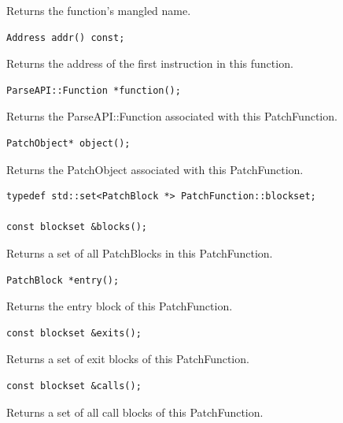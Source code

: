 \documentclass[11pt]{article}
\begin{document}
Returns the function's mangled name.


\begin{verbatim}
Address addr() const;

\end{verbatim}



Returns the address of the first instruction in this function.


\begin{verbatim}
ParseAPI::Function *function();

\end{verbatim}



Returns the ParseAPI::Function associated with this PatchFunction.


\begin{verbatim}
PatchObject* object();

\end{verbatim}



Returns the PatchObject associated with this PatchFunction.


\begin{verbatim}
typedef std::set<PatchBlock *> PatchFunction::blockset;

const blockset &blocks();

\end{verbatim}



Returns a set of all PatchBlocks in this PatchFunction.


\begin{verbatim}
PatchBlock *entry();

\end{verbatim}



Returns the entry block of this PatchFunction.


\begin{verbatim}
const blockset &exits();

\end{verbatim}



Returns a set of exit blocks of this PatchFunction.


\begin{verbatim}
const blockset &calls();

\end{verbatim}



Returns a set of all call blocks of this PatchFunction.
\end{document}
